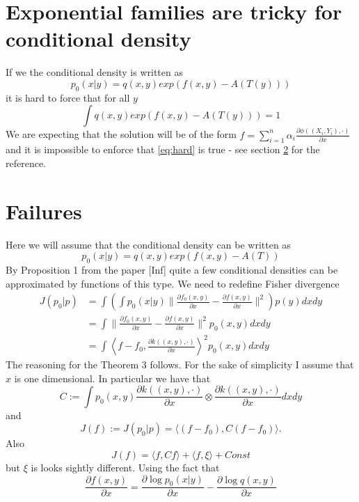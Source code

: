 \documentclass[10pt]{article}
\begin{document}
\section{Exponential families are tricky for conditional density}
If we the conditional density is written as 
\begin{equation}
p_0(x|y) = q(x,y)exp(f(x,y) - A(T(y)) )
\end{equation} 
it is hard to force that for all $y$
\begin{equation}
\label{eq:hard}
\int q(x,y)exp(f(x,y) - A(T(y)) )=1
\end{equation}
We are expecting that the solution will be of the form $f = \sum_{i=1}^n \alpha_i \frac{\partial  \phi( (X_i,Y_i), \cdot)} {\partial x} $ and it is impossible to enforce that \eqref{eq:hard} is true - see section \ref{sec:fail} for the reference.





\section{Failures}
\label{sec:fail}
Here we will assume that the conditional density can be written as 
\begin{equation}
p_0(x|y) = q(x,y)exp(f(x,y) - A(T))
\end{equation} 
By Proposition 1 from the paper [Inf] quite a few conditional densities can be approximated by functions of this type. We need to redefine Fisher divergence   
\begin{align}
J(p_0|p) &= \int \left( \int p_0(x|y) \parallel \frac{\partial  f_0(x,y)} {\partial x} -\frac{\partial  f(x,y)} {\partial x} \parallel^2 \right )p(y) dx dy  \\
&=  \int  \parallel \frac{\partial  f_0(x,y)} {\partial x} -\frac{\partial  f(x,y)} {\partial x} \parallel^2 p_0(x,y) dx dy \\
&=  \int   \left \langle f-f_0,\frac{\partial  k( (x,y), \cdot)} {\partial x} \right \rangle^2    p_0(x,y) dx dy
\end{align}
The reasoning for the Theorem 3 follows. For the sake of simplicity I assume that $x$ is one dimensional. In particular we have that 
\begin{equation}
 C := \int  p_0(x,y) \frac{\partial  k( (x,y), \cdot)} {\partial x} \otimes \frac{\partial  k( (x,y), \cdot)} {\partial x} dx dy
\end{equation}
and 
\begin{equation}
 J(f) := J(p_0|p) = \langle (f -f_0),C(f -f_0) \rangle.
\end{equation}
Also 
\begin{equation}
 J(f) = \langle f,Cf \rangle + \langle f,\xi \rangle + Const
\end{equation}
but $\xi$ is looks sightly different. Using the fact that
\begin{equation}
 \frac{\partial  f(x,y)} {\partial x}  = \frac{\partial  \log p_0(x|y)}{\partial x} - \frac{\partial  \log q(x,y)}{\partial x}
\end{equation}
\end{document}
